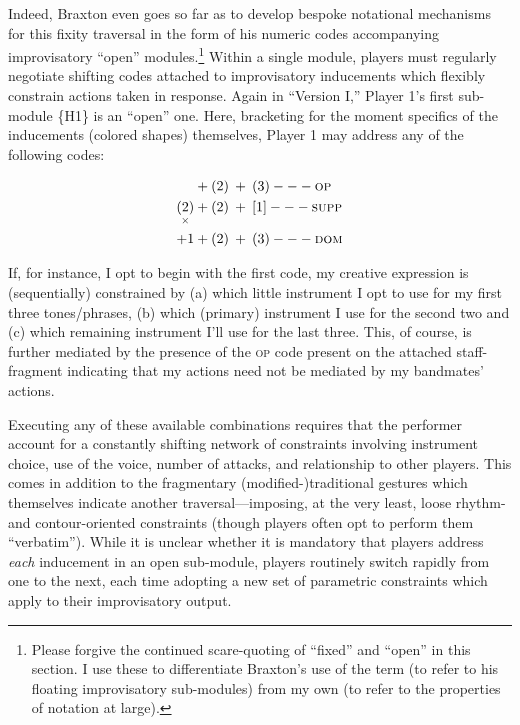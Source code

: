         Indeed, Braxton even goes so far as to develop bespoke notational mechanisms for this fixity traversal in the form of his numeric codes accompanying improvisatory ``open'' modules.\footnote{Please forgive the continued scare-quoting of ``fixed'' and ``open'' in this section. I use these to differentiate Braxton's use of the term (to refer to his floating improvisatory sub-modules) from my own (to refer to the properties of notation at large).} Within a single module, players must regularly negotiate shifting codes attached to improvisatory inducements which flexibly constrain actions taken in response. Again in ``Version I,'' Player 1's first sub-module \{H1\} is an ``open'' one. Here, bracketing for the moment specifics of the inducements (colored shapes) themselves, Player 1 may address any of the following codes:


        \vspace{-15pt}
            \begin{align}
                [3]\:+&\:(2)\:+\:(3)---\textsc{op} \\
                \underset{\times}{(2)}\:+&\:(2)\:+\:[1]---\textsc{supp} \\
                +1\:+&\:(2)\:+\:(3)---\textsc{dom}
            \end{align}

        If, for instance, I opt to begin with the first code, my creative expression is (sequentially) constrained by (a) which little instrument I opt to use for my first three tones/phrases, (b) which (primary) instrument I use for the second two and (c) which remaining instrument I'll use for the last three. This, of course, is further mediated by the presence of the \textsc{op} code present on the attached staff-fragment indicating that my actions need not be mediated by my bandmates' actions. 
        
        Executing any of these available combinations requires that the performer account for a constantly shifting network of constraints involving instrument choice, use of the voice, number of attacks, and relationship to other players.  This comes in addition to the fragmentary (modified-)traditional gestures which themselves indicate another traversal---imposing, at the very least, loose rhythm- and contour-oriented constraints (though players often opt to perform them ``verbatim''). While it is unclear whether it is mandatory that players address \textit{each} inducement in an open sub-module, players routinely switch rapidly from one to the next, each time adopting a new set of parametric constraints which apply to their improvisatory output. 

